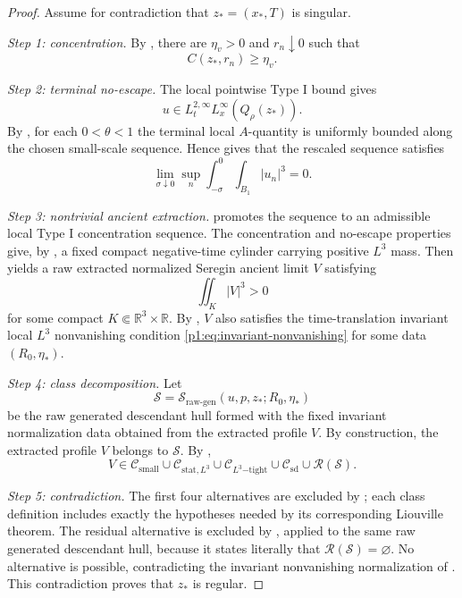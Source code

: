 \documentclass[11pt]{amsart}
\theoremstyle{plain}
\theoremstyle{definition}
\theoremstyle{remark}
\numberwithin{equation}{section}
\newcommand{\R}{\mathbb R}
\newcommand{\calS}{\mathcal S}
\newcommand{\calR}{\mathcal R}
\newcommand{\calC}{\mathcal C}
\begin{document}
\begin{proof}
Assume for contradiction that \(z_*=(x_*,T)\) is singular.

\emph{Step 1: concentration.}
By , there are \(\eta_v>0\) and
\(r_n\downarrow0\) such that
\[
   C(z_*,r_n)\ge\eta_v .
\]

\emph{Step 2: terminal no-escape.}
The local pointwise Type I bound gives
\[
   u\in L_t^{2,\infty}L_x^\infty(Q_\rho(z_*)).
\]
By , for each \(0<\theta<1\) the
terminal local \(A\)-quantity is uniformly bounded along the chosen
small-scale sequence.  Hence  gives that
the rescaled sequence satisfies
\[
   \lim_{\sigma\downarrow0}\sup_n
   \int_{-\sigma}^{0}\int_{B_1}|u_n|^3=0 .
\]

\emph{Step 3: nontrivial ancient extraction.}
 promotes the sequence to
an admissible local Type I concentration sequence.  The concentration and no-escape
properties give, by
, a fixed compact
negative-time cylinder carrying positive \(L^3\) mass.  Then
 yields a raw extracted normalized
Seregin ancient limit \(V\) satisfying
\[
   \iint_K |V|^3>0
\]
for some compact \(K\Subset\R^3\times\R\).  By
, \(V\) also satisfies the
time-translation invariant local \(L^3\) nonvanishing condition
\eqref{p1:eq:invariant-nonvanishing} for some data \((R_0,\eta_*)\).

\emph{Step 4: class decomposition.}
Let
\[
   \calS=\calS_{\mathrm{raw\text{-}gen}}(u,p,z_*;R_0,\eta_*)
\]
be the raw generated descendant hull formed with the fixed invariant
normalization data obtained from the extracted profile \(V\).  By construction, the
extracted profile \(V\) belongs to \(\calS\).  By ,
\[
   V\in
   \calC_{\mathrm{small}}
   \cup
   \calC_{\mathrm{stat},L^3}
   \cup
   \calC_{L^3\mathrm{-tight}}
   \cup
   \calC_{\mathrm{sd}}
   \cup
   \calR(\calS).
\]

\emph{Step 5: contradiction.}
The first four alternatives are excluded by
; each class definition includes exactly
the hypotheses needed by its corresponding Liouville theorem.  The residual
alternative is excluded by , applied to the same raw
generated descendant hull, because it states literally that
\(\calR(\calS)=\varnothing\).  No alternative is possible, contradicting
the invariant nonvanishing normalization of .
This contradiction proves that \(z_*\) is regular.
\end{proof}
\end{document}
